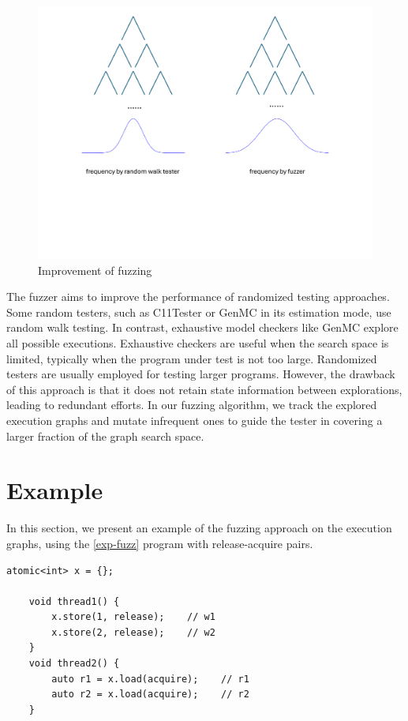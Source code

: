 \begin{figure}[h!tbp] 
    \centering
    \includegraphics[scale=0.28]{figure/tree_freq.pdf} 
    \caption{Improvement of fuzzing}  
    \label{tree-freq}  
\end{figure}


The fuzzer aims to improve the performance of randomized testing approaches. Some random testers, such as C11Tester or GenMC in its estimation mode, use random walk testing. In contrast, exhaustive model checkers like GenMC explore all possible executions. Exhaustive checkers are useful when the search space is limited, typically when the program under test is not too large. Randomized testers are usually employed for testing larger programs. However, the drawback of this approach is that it does not retain state information between explorations, leading to redundant efforts. In our fuzzing algorithm, we track the explored execution graphs and mutate infrequent ones to guide the tester in covering a larger fraction of the graph search space.

\section{Example}

In this section, we present an example of the fuzzing approach on the execution graphs, using the \ref{exp-fuzz} program with release-acquire pairs. 

\begin{lstlisting}[caption={Fuzzing example}, label={exp-fuzz}]
    atomic<int> x = {};
    
    void thread1() {
        x.store(1, release);    // w1
        x.store(2, release);    // w2
    }
    void thread2() {
        auto r1 = x.load(acquire);    // r1
        auto r2 = x.load(acquire);    // r2
    }
    \end{lstlisting}



